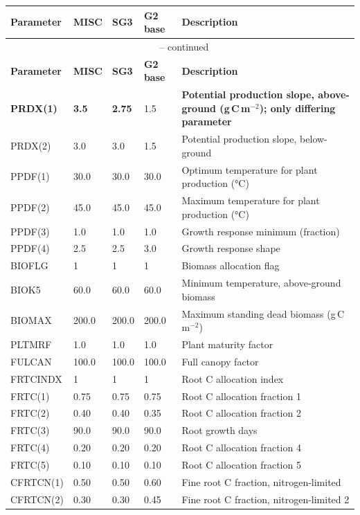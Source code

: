 \documentclass[11pt]{article}
\begin{document}
\begin{longtable}{llllp{6cm}}
\toprule
\textbf{Parameter} & \textbf{MISC} & \textbf{SG3} & \textbf{G2 base} & \textbf{Description} \\
\midrule
\endfirsthead
\multicolumn{5}{c}{\tablename\ \thetable{} -- continued} \\
\toprule
\textbf{Parameter} & \textbf{MISC} & \textbf{SG3} & \textbf{G2 base} & \textbf{Description} \\
\midrule
\endhead
\bottomrule
\endlastfoot
\textbf{PRDX(1)} & \textbf{3.5} & \textbf{2.75} & 1.5 & \textbf{Potential production slope, above-ground (g\,C\,m$^{-2}$); only differing parameter} \\
PRDX(2) & 3.0 & 3.0 & 1.5 & Potential production slope, below-ground \\
PPDF(1) & 30.0 & 30.0 & 30.0 & Optimum temperature for plant production (°C) \\
PPDF(2) & 45.0 & 45.0 & 45.0 & Maximum temperature for plant production (°C) \\
PPDF(3) & 1.0 & 1.0 & 1.0 & Growth response minimum (fraction) \\
PPDF(4) & 2.5 & 2.5 & 3.0 & Growth response shape \\
BIOFLG & 1 & 1 & 1 & Biomass allocation flag \\
BIOK5 & 60.0 & 60.0 & 60.0 & Minimum temperature, above-ground biomass \\
BIOMAX & 200.0 & 200.0 & 200.0 & Maximum standing dead biomass (g\,C\,m$^{-2}$) \\
PLTMRF & 1.0 & 1.0 & 1.0 & Plant maturity factor \\
FULCAN & 100.0 & 100.0 & 100.0 & Full canopy factor \\
FRTCINDX & 1 & 1 & 1 & Root C allocation index \\
FRTC(1) & 0.75 & 0.75 & 0.75 & Root C allocation fraction 1 \\
FRTC(2) & 0.40 & 0.40 & 0.35 & Root C allocation fraction 2 \\
FRTC(3) & 90.0 & 90.0 & 90.0 & Root growth days \\
FRTC(4) & 0.20 & 0.20 & 0.20 & Root C allocation fraction 4 \\
FRTC(5) & 0.10 & 0.10 & 0.10 & Root C allocation fraction 5 \\
CFRTCN(1) & 0.50 & 0.50 & 0.60 & Fine root C fraction, nitrogen-limited \\
CFRTCN(2) & 0.30 & 0.30 & 0.45 & Fine root C fraction, nitrogen-limited 2 \\

\end{longtable}
\end{document}
